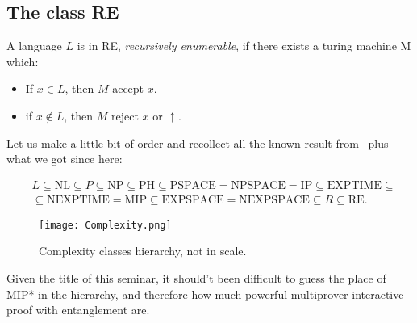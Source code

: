 \subsection{The class RE}

\begin{defn}
A language $L$ is in RE, \emph{recursively enumerable}, if there exists a turing machine M which:
\begin{itemize}
\item If $x \in L$, then $M$ accept $x$.
\item if $x \notin L$, then $M$ reject $x$ or $\uparrow$.
\end{itemize}
\end{defn}

Let us make a little bit of order and recollect all the known result from~\cite{papadimitriou1994computational} plus what we got since here:

\begin{equation}
\begin{split}
    &L \subseteq \text{NL} \subseteq P \subseteq \text{NP} \subseteq \text{PH} \subseteq \text{PSPACE} = \text{NPSPACE} = \text{IP} \subseteq \text{EXPTIME} \subseteq  \\
    &\subseteq \text{NEXPTIME} = \text{MIP} \subseteq \text{EXPSPACE} = \text{NEXPSPACE} \subseteq R \subseteq \text{RE}.
\end{split}
\end{equation}

\begin{figure}[htb]
    \texttt{[image: Complexity.png]}
    \centering
    \caption{Complexity classes hierarchy, not in scale.}
    \end{figure}

Given the title of this seminar, it should't been difficult to guess the place of MIP* in the hierarchy, and therefore how much powerful multiprover interactive proof with entanglement are.

